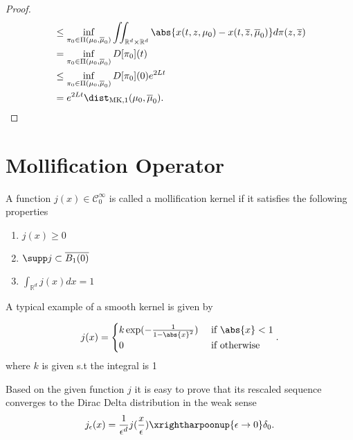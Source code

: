 \begin{proof}
\begin{align*}
                                                      &\le  \inf_{\pi_0 \in \Pi(\mu_0,\overline{\mu }_0) } \iint_{\mathbb{R}^{d} \times  \mathbb{R}^{d}  } \abs{x(t,z,\mu_0)-x(t,\overline{z},\overline{\mu }_0)  } d\pi(z,\overline{z} )\\
                                                      &=  \inf_{\pi_0 \in \Pi(\mu_0,\overline{\mu }_0) } D[\pi_0] (t)\\
                                                      &\le \inf_{\pi_0 \in  \Pi(\mu_0,\overline{\mu }_0 )}D[\pi_0](0) e^{2Lt} \\
                                                      &= e^{2Lt} \dist_{\text{MK},1}(\mu_0,\overline{\mu }_0 )
.\end{align*}
\end{proof}
\section{Mollification Operator}
\begin{definition}
A function $j(x) \in  \mathcal{C}_0^{\infty} $ is called a mollification kernel  if it satisfies
the following properties
\begin{enumerate}
  \item $j(x) \ge 0$  
  \item $\supp j \subset  \overline{B_1(0)}  $
  \item $\int_{\mathbb{R}^{d} } j(x) dx = 1$
\end{enumerate} 
\end{definition}
A typical example of a smooth kernel is  given by 
\begin{example}
 \begin{align*}
   j(x) = \begin{cases}
     k \exp(-\frac{1}{1-\abs{x}^2}) &\text{ if } \abs{x} < 1 \\
     0 &\text{ if } \text{otherwise}
   \end{cases} 
 .\end{align*}
 where $k$ is given s.t the integral is 1 
\end{example}
\begin{remark}
 Based on the given function $j$ it is easy to prove that its rescaled sequence converges to 
 the Dirac Delta distribution in the weak sense 
 \begin{align*}
   j_{\epsilon}(x) = \frac{1}{\epsilon^d}j(\frac{x}{\epsilon}) \xrightharpoonup{\epsilon \to 0} \delta_0
 .\end{align*}
\end{remark}
